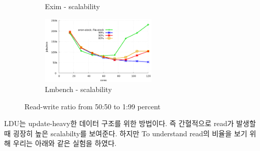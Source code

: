 \begin{figure}[t!]
\begin{subfigure}[b]{0.33\textwidth}
        \caption{Exim - scalability}
    \end{subfigure}
    \begin{subfigure}[b]{0.33\textwidth}
        \includegraphics[height=1.3in]{graph/ratio_lmbench_core.eps}
        \caption{Lmbench - scalability}
    \end{subfigure}
    \caption{Read-write ratio from 50:50 to 1:99 percent}
    
\end{figure}

\ifkor
LDU는 update-heavy한 데이터 구조를 위한 방법이다. 즉 간혈적으로 read가 발생할 때 
굉장히 높은 scalabilty를 보여준다.
하지만 To understand read의 비율을 보기 위해 우리는 아래와 같은 실험을 하였다.

\else

\fi
















